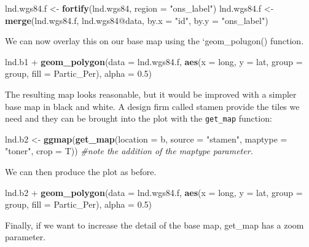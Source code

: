 \documentclass[]{article}
\newenvironment{Shaded}{}{}
\newcommand{\KeywordTok}[1]{\textcolor[rgb]{0.00,0.44,0.13}{\textbf{{#1}}}}
\newcommand{\DataTypeTok}[1]{\textcolor[rgb]{0.56,0.13,0.00}{{#1}}}
\newcommand{\FloatTok}[1]{\textcolor[rgb]{0.25,0.63,0.44}{{#1}}}
\newcommand{\StringTok}[1]{\textcolor[rgb]{0.25,0.44,0.63}{{#1}}}
\newcommand{\CommentTok}[1]{\textcolor[rgb]{0.38,0.63,0.69}{\textit{{#1}}}}
\newcommand{\NormalTok}[1]{{#1}}
\begin{document}
\begin{Shaded}
\begin{Highlighting}[]
\NormalTok{lnd.wgs84.f <- }\KeywordTok{fortify}\NormalTok{(lnd.wgs84, }\DataTypeTok{region =} \StringTok{"ons_label"}\NormalTok{)}
\NormalTok{lnd.wgs84.f <- }\KeywordTok{merge}\NormalTok{(lnd.wgs84.f, lnd.wgs84@data, }\DataTypeTok{by.x =} \StringTok{"id"}\NormalTok{, }\DataTypeTok{by.y =} \StringTok{"ons_label"}\NormalTok{)}
\end{Highlighting}
\end{Shaded}
We can now overlay this on our base map using the `geom\_polugon()
function.

\begin{Shaded}
\begin{Highlighting}[]
\NormalTok{lnd.b1 + }\KeywordTok{geom_polygon}\NormalTok{(}\DataTypeTok{data =} \NormalTok{lnd.wgs84.f, }\KeywordTok{aes}\NormalTok{(}\DataTypeTok{x =} \NormalTok{long, }\DataTypeTok{y =} \NormalTok{lat, }\DataTypeTok{group =} \NormalTok{group, }
    \DataTypeTok{fill =} \NormalTok{Partic_Per), }\DataTypeTok{alpha =} \FloatTok{0.5}\NormalTok{)}
\end{Highlighting}
\end{Shaded}
The resulting map looks reasonable, but it would be improved with a
simpler base map in black and white. A design firm called stamen provide
the tiles we need and they can be brought into the plot with the
\texttt{get\_map} function:

\begin{Shaded}
\begin{Highlighting}[]
\NormalTok{lnd.b2 <- }\KeywordTok{ggmap}\NormalTok{(}\KeywordTok{get_map}\NormalTok{(}\DataTypeTok{location =} \NormalTok{b, }\DataTypeTok{source =} \StringTok{"stamen"}\NormalTok{, }\DataTypeTok{maptype =} \StringTok{"toner"}\NormalTok{, }
    \DataTypeTok{crop =} \NormalTok{T))  }\CommentTok{#note the addition of the maptype parameter.}
\end{Highlighting}
\end{Shaded}
We can then produce the plot as before.

\begin{Shaded}
\begin{Highlighting}[]
\NormalTok{lnd.b2 + }\KeywordTok{geom_polygon}\NormalTok{(}\DataTypeTok{data =} \NormalTok{lnd.wgs84.f, }\KeywordTok{aes}\NormalTok{(}\DataTypeTok{x =} \NormalTok{long, }\DataTypeTok{y =} \NormalTok{lat, }\DataTypeTok{group =} \NormalTok{group, }
    \DataTypeTok{fill =} \NormalTok{Partic_Per), }\DataTypeTok{alpha =} \FloatTok{0.5}\NormalTok{)}
\end{Highlighting}
\end{Shaded}
Finally, if we want to increase the detail of the base map, get\_map has
a zoom parameter.
\end{document}
